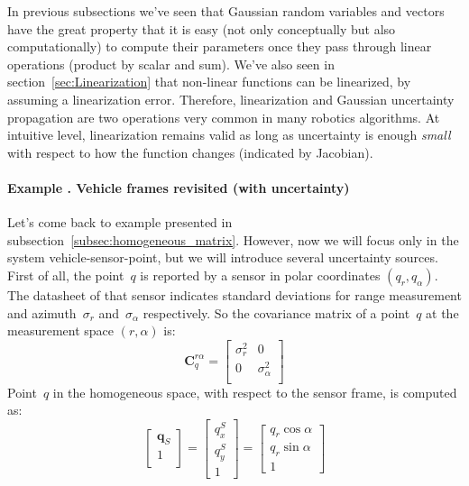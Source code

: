 In previous subsections we've seen that Gaussian random variables and vectors have the great property that it is easy (not only conceptually but also computationally) to compute their parameters once they pass through linear operations (product by scalar and sum). We've also seen in section~\ref{sec:Linearization} that non-linear functions can be linearized, by assuming a linearization error. Therefore, linearization and Gaussian uncertainty propagation are two operations very common in many robotics algorithms. At intuitive level, linearization remains valid as long as uncertainty is enough \textit{small} with respect to how the function changes (indicated by Jacobian). 

\paragraph{Example \theexamplecounter. Vehicle frames revisited (with uncertainty)}
Let's come back to example presented in subsection~\ref{subsec:homogeneous_matrix}. However, now we will focus only in the system vehicle-sensor-point, but we will introduce several uncertainty sources. First of all, the point~$q$ is reported by a sensor in polar coordinates $(q_r,q_{\alpha})$. The datasheet of that sensor indicates standard deviations for range measurement and azimuth~$\sigma_r$ and~$\sigma_{\alpha}$ respectively. So the covariance matrix of a point~$q$ at the measurement space $(r,\alpha)$ is:
\begin{equation}
 \mathbf{C}^{r\alpha}_q = 
 \left[
 \begin{array}{cc}
 \sigma^2_r & 0                \\
 0          & \sigma^2_{\alpha} \\
 \end{array}
 \right]
\end{equation}
Point~$q$ in the homogeneous space, with respect to the sensor frame, is computed as:
\begin{equation}
\left[
\begin{array}{c}
    \mathbf{q}_S\\
    1 \\
 \end{array}
\right]
=
 \left[
 \begin{array}{c}
 q^S_x \\
 q^S_y \\
 1
 \end{array}
 \right]
  =
 \left[
 \begin{array}{c}
 q_r \cos \alpha \\
 q_r \sin \alpha \\
 1
 \end{array}
 \right]
\end{equation}
